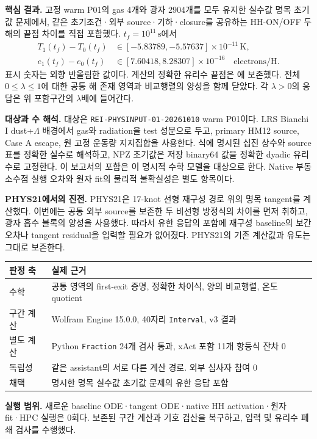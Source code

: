 \documentclass[11pt,a4paper]{article}
\numberwithin{equation}{section}
\newcommand{\mytitle}[2]{\vspace*{2mm}{\large\sffamily\color{ink}#1}\par\vspace{2mm}{\LARGE\bfseries #2}\par\vspace{3mm}}
\begin{document}
\mytitle{이론 연구 결과 · 복구 후 확정본}{결합 gas--photon 계의 유한 HH 응답 포함}
\textbf{핵심 결과.} 고정 warm P01의 gas 4개와 광자 2904개를 모두 유지한 실수값 명목 초기값 문제에서, 같은 초기조건·외부 source·기하·closure를 공유하는 HH-ON/OFF 두 해의 끝점 차이를 직접 포함했다. $t_f=10^{11}\,\mathrm s$에서
\begin{align}
 T_1(t_f)-T_0(t_f)&\in[-5.83789,-5.57637]\times10^{-11}\,\mathrm K,\\
 e_1(t_f)-e_0(t_f)&\in[7.60418,8.28307]\times10^{-16}\quad\text{electrons/H}.
\end{align}
표시 숫자는 외향 반올림한 값이다. 계산의 정확한 유리수 끝점은 에 보존했다. 전체 $0\le\lambda\le1$에 대한 공통 해 존재 영역과 비교행렬의 양성을 함께 닫았다. 각 $\lambda>0$의 응답은 위 포함구간의 $\lambda$배에 들어간다.

\textbf{대상과 수 해석.} 대상은 \texttt{REI-PHYSINPUT-01-20261010} warm P01이다. LRS Bianchi I dust+$\Lambda$ 배경에서 gas와 radiation을 test 성분으로 두고, primary HM12 source, Case A escape, 원 고정 운동량 지지집합을 사용한다. 식에 명시된 십진 상수와 source 표를 정확한 실수로 해석하고, NPZ 초기값은 저장 binary64 값을 정확한 dyadic 유리수로 고정한다. 이 보고서의 포함은 이 명시적 수학 모델을 대상으로 한다. Native 부동소수점 실행 오차와 원자 fit의 물리적 불확실성은 별도 항목이다.

\textbf{PHYS21에서의 진전.} PHYS21은 17-knot 선형 재구성 경로 위의 명목 tangent를 계산했다. 이번에는 공통 외부 source를 보존한 두 비선형 방정식의 차이를 먼저 취하고, 광자 흡수 블록의 양성을 사용했다. 따라서 유한 응답의 포함에 재구성 baseline의 보간 오차나 tangent residual을 입력할 필요가 없어졌다. PHYS21의 기존 계산값과 유도는 그대로 보존한다.

\begin{center}
\begin{tabularx}{\linewidth}{@{}lX@{}}\toprule
판정 축 & 실제 근거\\\midrule
수학 & 공통 영역의 first-exit 증명, 정확한 차이식, 양의 비교행렬, 온도 quotient\\
구간 계산 & Wolfram Engine 15.0.0, 40자리 \texttt{Interval}, v3 결과\\
별도 계산 & Python \texttt{Fraction} 24개 검사 통과, xAct 포함 11개 항등식 잔차 0\\
독립성 & 같은 assistant의 서로 다른 계산 경로. 외부 심사자 참여 0\\
채택 & 명시한 명목 실수값 초기값 문제의 유한 응답 포함\\\bottomrule
\end{tabularx}
\end{center}
\textbf{실행 범위.} 새로운 baseline ODE·tangent ODE·native HH activation·원자 fit·HPC 실행은 0회다. 보존된 구간 계산과 기호 검산을 복구하고, 입력 및 유리수 폐쇄 검사를 수행했다.
\end{document}
